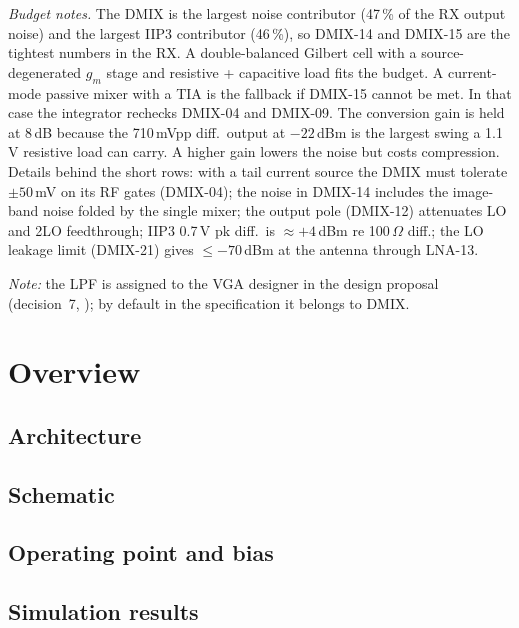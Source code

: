 \noindent\textit{Budget notes.} The DMIX is the largest noise contributor
(47\,\% of the RX output noise) and the largest IIP3 contributor (46\,\%), so DMIX-14
and DMIX-15 are the tightest numbers in the RX. A double-balanced Gilbert cell with a
source-degenerated $g_m$ stage and resistive + capacitive load fits the budget. A
current-mode passive mixer with a TIA is the fallback if DMIX-15 cannot be met. In that
case the integrator rechecks DMIX-04 and DMIX-09. The conversion gain is held at 8\,dB
because the 710\,mVpp diff.\ output at $-22$\,dBm is the largest swing a 1.1\,V resistive
load can carry. A higher gain lowers the noise but costs compression.
Details behind the short rows: with a tail current source the DMIX must tolerate
$\pm 50$\,mV on its RF gates (DMIX-04); the noise in DMIX-14 includes the image-band
noise folded by the single mixer; the output pole (DMIX-12) attenuates LO and 2LO
feedthrough; IIP3 0.7\,V pk diff.\ is $\approx +4$\,dBm re 100\,$\Omega$ diff.; the
LO leakage limit (DMIX-21) gives $\leq -70$\,dBm at the antenna through LNA-13.

\noindent\textit{Note:} the LPF is assigned to the VGA designer in the design
proposal (decision~7, ); by default in the specification it belongs
to DMIX.

\section{Overview}

\subsection{Architecture}

\subsection{Schematic}

\subsection{Operating point and bias}

\subsection{Simulation results}

